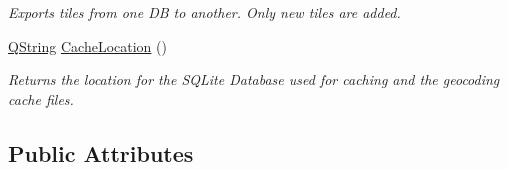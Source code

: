 \begin{DoxyCompactItemize}
\begin{DoxyCompactList}\small\item\em Exports tiles from one D\-B to another. Only new tiles are added. \end{DoxyCompactList}\item 
\hyperlink{group___u_a_v_objects_plugin_gab9d252f49c333c94a72f97ce3105a32d}{Q\-String} \hyperlink{group___o_p_map_widget_ga1edc453f938348b4b2400fe6310bae75}{Cache\-Location} ()
\begin{DoxyCompactList}\small\item\em Returns the location for the S\-Q\-Lite Database used for caching and the geocoding cache files. \end{DoxyCompactList}\end{DoxyCompactItemize}
\subsection*{Public Attributes}
